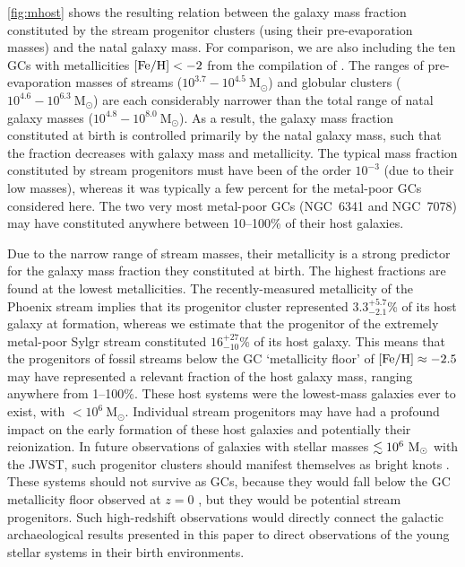 \documentclass[twocolumn]{aastex63}
\newcommand{\msun}{\ensuremath{\textrm{M}_\odot}}
\begin{document}
\autoref{fig:mhost} shows the resulting relation between the galaxy mass fraction constituted by the stream progenitor clusters (using their pre-evaporation masses) and the natal galaxy mass. For comparison, we are also including the ten GCs with metallicities $[{\rm Fe}/{\rm H}]<-2$ from the compilation of \citet{kruijssen19e}. The ranges of pre-evaporation masses of streams ($10^{3.7}{-}10^{4.5}~\msun$) and globular clusters ($10^{4.6}{-}10^{6.3}~\msun$) are each considerably narrower than the total range of natal galaxy masses ($10^{4.8}{-}10^{8.0}~\msun$). As a result, the galaxy mass fraction constituted at birth is controlled primarily by the natal galaxy mass, such that the fraction decreases with galaxy mass and metallicity. The typical mass fraction constituted by stream progenitors must have been of the order $10^{-3}$ (due to their low masses), whereas it was typically a few percent for the metal-poor GCs considered here. The two very most metal-poor GCs (NGC~6341 and NGC~7078) may have constituted anywhere between 10--100\% of their host galaxies.

Due to the narrow range of stream masses, their metallicity is a strong predictor for the galaxy mass fraction they constituted at birth. The highest fractions are found at the lowest metallicities. The recently-measured metallicity of the Phoenix stream \citep{wan20} implies that its progenitor cluster represented $3.3_{-2.1}^{+5.7}$\% of its host galaxy at formation, whereas we estimate that the progenitor of the extremely metal-poor Sylgr stream \citep{ibata:2019,roederer:2019} constituted $16_{-10}^{+27}$\% of its host galaxy. This means that the progenitors of fossil streams below the GC `metallicity floor' \citep{beasley:2019,kruijssen19c} of $[{\rm Fe}/{\rm H}]\approx-2.5$ may have represented a relevant fraction of the host galaxy mass, ranging anywhere from 1--100\%. These host systems were the lowest-mass galaxies ever to exist, with $<10^6~\msun$. Individual stream progenitors may have had a profound impact on the early formation of these host galaxies and potentially their reionization. In future observations of galaxies with stellar masses $\la10^6~\msun$ with the JWST, such progenitor clusters should manifest themselves as bright knots \citep[e.g.][]{pfeffer19}. These systems should not survive as GCs, because they would fall below the GC metallicity floor observed at $z=0$ \citep[except under rare circumstances, see][]{larsen20}, but they would be potential stream progenitors. Such high-redshift observations would directly connect the galactic archaeological results presented in this paper to direct observations of the young stellar systems in their birth environments.
\end{document}

